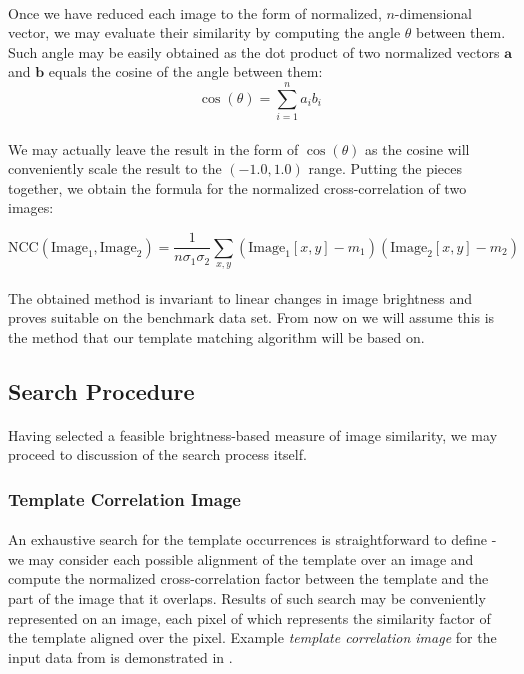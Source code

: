 \paragraph*{}
Once we have reduced each image to the form of normalized, $n$-dimensional vector, we may evaluate their similarity by computing the angle $\theta$ between them. Such angle may be easily obtained as the dot product of two normalized vectors $\mathbf{a}$ and $\mathbf{b}$ equals the cosine of the angle between them:
\[
	\cos(\theta) = \sum_{i=1}^n a_i b_i
\] 

\paragraph*{}
We may actually leave the result in the form of $\cos(\theta)$ as the cosine will conveniently scale the result to the $(-1.0, 1.0)$ range. Putting the pieces together, we obtain the formula for the normalized cross-correlation of two images:

\[
\mbox{NCC}(\mbox{Image}_1,\mbox{Image}_2) = \frac{1}{n\sigma_1 \sigma_2} \sum_{x,y} (\mbox{Image}_1[x,y]-m_1)(\mbox{Image}_2[x,y]-m_2)
\]

\paragraph*{}
The obtained method is invariant to linear changes in image brightness and proves suitable on the benchmark data set. From now on we will assume this is the method that our template matching algorithm will be based on.

\subsection{Search Procedure}

\paragraph*{}
Having selected a feasible brightness-based measure of image similarity, we may proceed to discussion of the search process itself.

\subsubsection{Template Correlation Image}

\paragraph*{}
An exhaustive search for the template occurrences is straightforward to define - we may consider each possible alignment of the template over an image and compute the normalized cross-correlation factor between the template and the part of the image that it overlaps. Results of such search may be conveniently represented on an image, each pixel of which represents the similarity factor of the template aligned over the pixel. Example \textit{template correlation image} for the input data from  is demonstrated in .


